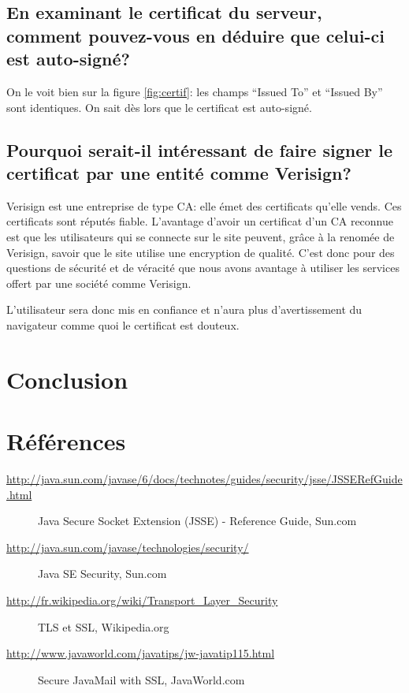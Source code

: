 \documentclass[10pt,a4paper,titlepage]{article}
\begin{document}
\subsection{En examinant le certificat du serveur, comment pouvez-vous en déduire que celui-ci est auto-signé?}

On le voit bien sur la figure \ref{fig:certif}: les champs “Issued To” et “Issued By” sont identiques. On sait dès lors que le certificat est auto-signé. 

\subsection{Pourquoi serait-il intéressant de faire signer le certificat par une entité comme Verisign?}

Verisign est une entreprise de type CA: elle émet des certificats qu'elle vends. Ces certificats sont réputés fiable. L'avantage d'avoir un certificat d'un CA reconnue est que les utilisateurs qui se connecte sur le site peuvent, grâce à la renomée de Verisign, savoir que le site utilise une encryption de qualité. C'est donc pour des questions de sécurité et de véracité que nous avons avantage à utiliser les services offert par une société comme Verisign.

L'utilisateur sera donc mis en confiance et n'aura plus d'avertissement du navigateur comme quoi le certificat est douteux. 

\section{Conclusion}



\section{Références}

\small
\begin{description}
	\item[\url{http://java.sun.com/javase/6/docs/technotes/guides/security/jsse/JSSERefGuide.html}]	Java Secure Socket Extension (JSSE) - Reference Guide, Sun.com
	\item[\url{http://java.sun.com/javase/technologies/security/}] Java SE Security, Sun.com
	\item[\url{http://fr.wikipedia.org/wiki/Transport_Layer_Security}] {TLS et SSL, Wikipedia.org}
	\item[\url{http://www.javaworld.com/javatips/jw-javatip115.html}] Secure JavaMail with SSL, JavaWorld.com
\end{description}
\end{document}
